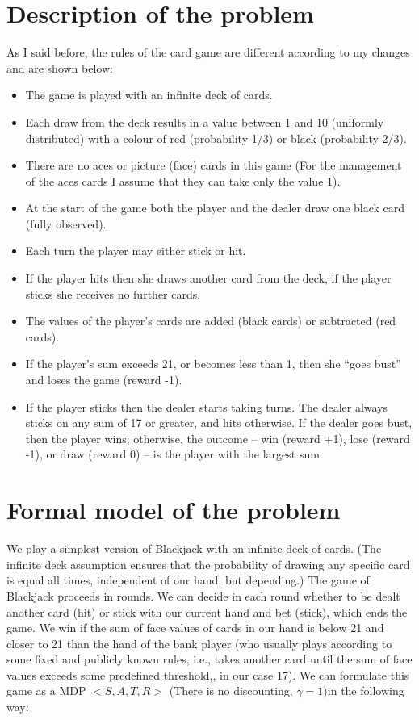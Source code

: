 \documentclass[11pt]{article}
\theoremstyle{plain}
\theoremstyle{definition}
\begin{document}
\section{Description of the problem}
As I said before, the rules of the card game are different according to my changes and are shown below:
\begin{itemize}
\item The game is played with an infinite deck of cards.
\item Each draw from the deck results in a value between 1 and 10 (uniformly distributed) with a colour of red (probability 1/3) or black (probability 2/3).
\item There are no aces or picture (face) cards in this game (For the management of the aces cards I assume that they can take only the value 1).
\item At the start of the game both the player and the dealer draw one black card (fully observed).
\item Each turn the player may either stick or hit.
\item If the player hits then she draws another card from the deck, if the player sticks she receives no further cards.
\item The values of the player’s cards are added (black cards) or subtracted (red cards).
\item If the player’s sum exceeds 21, or becomes less than 1, then she “goes bust” and loses the game (reward -1).
\item If the player sticks then the dealer starts taking turns. The dealer always sticks on any sum of 17 or greater, and hits otherwise. If the dealer goes bust, then the player wins; otherwise, the outcome – win (reward +1), lose (reward -1), or draw (reward 0) – is the player with the largest sum.
\end{itemize}

\section{Formal model of the problem}
We play a simplest version of Blackjack with an infinite deck of cards. (The infinite deck assumption ensures that the probability of drawing any specific card is equal all times, independent of our hand, but depending.) The game of Blackjack proceeds in rounds. We can decide in each round whether to be dealt another card (hit) or stick with our current hand and bet (stick), which ends the game. We win if the sum of face values of cards in our hand is below 21 and closer to 21 than the hand of the bank player (who usually plays according to some fixed and publicly known rules, i.e., takes another card until the sum of face values exceeds some predefined threshold,, in our case 17).
We can formulate this game as a MDP $<S,A,T,R>$ (There is no discounting, $\gamma = 1)$in the following way:
\end{document}
